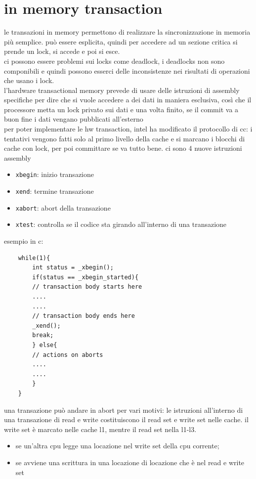 \documentclass[12pt, oneside]{extbook} %
\begin{document}
\section{in memory transaction}
le transazioni in memory permettono di realizzare la sincronizzazione in memoria più semplice. può essere esplicita, quindi per accedere ad un sezione critica si prende un lock, si accede e poi si esce.\\ ci possono essere problemi sui locks come deadlock, i deadlocks non sono componibili e quindi possono esserci delle inconsistenze nei risultati di operazioni che usano i lock.\\ l'hardware transactional memory prevede di usare delle istruzioni di assembly specifiche per dire che si vuole accedere a dei dati in maniera esclusiva, così che il processore metta un lock privato sui dati e una volta finito, se il commit va a buon fine i dati vengano pubblicati all'esterno\\ per poter implementare le hw transaction, intel ha modificato il protocollo di cc: i tentativi vengono fatti solo al primo livello della cache e si marcano i blocchi di cache con lock, per poi committare se va tutto bene. ci sono 4 nuove istruzioni assembly 
\begin{itemize}
	\item \texttt{xbegin}: inizio transazione
	\item \texttt{xend}: termine transazione
	\item \texttt{xabort}: abort della transazione
	\item \texttt{xtest}: controlla se il codice sta girando all'interno di una transazione
\end{itemize}
esempio in c:
\begin{lstlisting}
	while(1){
		int status = _xbegin();
		if(status == _xbegin_started){
		// transaction body starts here
		....
		....
		// transaction body ends here
		_xend();
		break;
		} else{
		// actions on aborts
		....
		....
		}
	}
\end{lstlisting}
una transazione può andare in abort per vari motivi: le istruzioni all'interno di una transazione di read e write costituiscono il read set e write set nelle cache. il write set è marcato nelle cache l1, mentre il read set nella l1-l3.
\begin{itemize}
	\item se un'altra cpu legge una locazione nel write set della cpu corrente;
	\item se avviene una scrittura in una locazione di locazione che è nel read e write set
\end{itemize}
\end{document}
